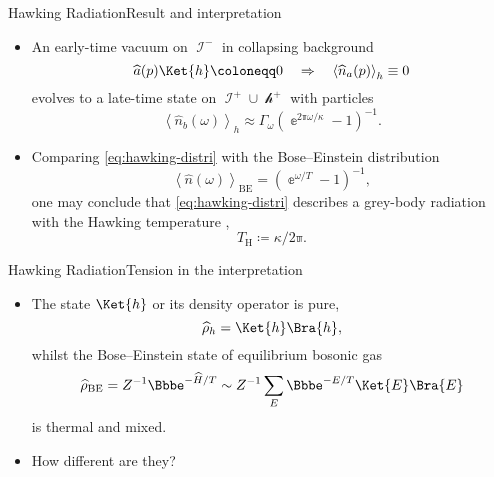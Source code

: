 \documentclass{beamer}
\newcommand{\ee}{{\Bbbe}}
\newcommand{\pp}{{\Bbbpi}}
\newcommand{\rbr}[1]{{\left(#1\right)}}
\newcommand{\abr}[1]{{\left<#1\right>}}
\newcommand{\rfun}[2]{{#1}\mathopen{}\left(#2\right)\mathclose{}}
\newcommand{\what}[1]{{\widehat{#1}}}
\begin{document}
\begin{frame}{Hawking Radiation}{Result and interpretation}

\begin{itemize}
\item An early-time \alert{vacuum} on $\mscrI^-$ in collapsing background
\begin{equation}
\rfun{\what{a}}{p}\Ket{h} \coloneqq 0\quad\Rightarrow\quad
\abr{\rfun{\what{n}_a}{p}}_h \equiv 0
\end{equation}
evolves to a late-time state on $\mscrI^+\cup\mscrh^+$ \alert{with particles}
\cite{HAWKING1974}
\begin{equation}
\abr{\rfun{\what{n}_b}{\omega}}_h \approx
\Gamma_\omega\rbr{\ee^{2\pp\omega/\kappa}-1}^{-1}.
\label{eq:hawking-distri}
\end{equation}
\item Comparing \cref{eq:hawking-distri} with the Bose--Einstein distribution
\begin{equation}
\abr{\rfun{\what{n}}{\omega}}_\text{BE} = \rbr{\ee^{\omega/T} - 1}^{-1}, 
\end{equation}
one may conclude that \cref{eq:hawking-distri} describes a grey-body
radiation with the \alert{Hawking temperature} \cite{Hawking1975},
\begin{equation}
T_\text{H} \coloneqq \kappa/2\pp.
\end{equation}

\end{itemize}

\end{frame}


\begin{frame}{Hawking Radiation}{Tension in the interpretation}
\begin{itemize}
\item The state $\Ket{h}$ or its density operator is \alert{pure},
\begin{equation}
\what{\rho}_h = \Ket{h}\Bra{h},
\end{equation}
whilst the Bose--Einstein state of equilibrium bosonic gas
\begin{equation}
\what{\rho}_\text{BE} = {Z}^{-1} \ee^{-\what{H}/T}
\sim Z^{-1} \sum_E \ee^{-E/T} \Ket{E}\Bra{E}
\end{equation}
is \alert{thermal} and \alert{mixed}.
\item How different are they? \cite{Kiefer2001,Hsu2009}
\end{itemize}
\end{frame}
\end{document}
